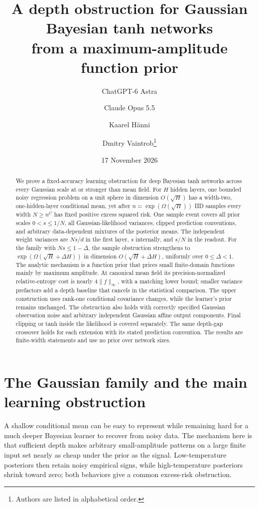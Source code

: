 \documentclass[11pt]{article}
\title{A depth obstruction for Gaussian Bayesian tanh networks\\from a maximum-amplitude function prior}
\author{ChatGPT-6 Astra \and Claude Opus 5.5 \and Kaarel H\"anni \and Dmitry Vaintrob\thanks{Authors are listed in alphabetical order.}}
\date{17 November 2026}
\begin{document}
\maketitle
\begin{abstract}
We prove a fixed-accuracy learning obstruction for deep Bayesian tanh networks across every Gaussian scale at or stronger than mean field. For $H$ hidden layers, one bounded noisy regression problem on a unit sphere in dimension $O(\sqrt H)$ has a width-two, one-hidden-layer conditional mean, yet after $n=\exp(\Omega(\sqrt H))$ IID samples every width $N\ge n^C$ has fixed positive excess squared risk. One sample event covers all prior scales $0<s\le1/N$, all Gaussian-likelihood variances, clipped prediction conventions, and arbitrary data-dependent mixtures of the posterior means. The independent weight variances are $Ns/d$ in the first layer, $s$ internally, and $s/N$ in the readout. For the family with $Ns\le1-\Delta$, the sample obstruction strengthens to $\exp(\Omega(\sqrt H+\Delta H))$ in dimension $O(\sqrt H+\Delta H)$, uniformly over $0\le\Delta<1$. The analytic mechanism is a function prior that prices small finite-domain functions mainly by maximum amplitude. At canonical mean field its precision-normalized relative-entropy cost is nearly $4\|f\|_\infty$, with a matching lower bound; smaller variance prefactors add a depth baseline that cancels in the statistical comparison. The upper construction uses rank-one conditional covariance changes, while the learner's prior remains unchanged. The obstruction also holds with correctly specified Gaussian observation noise and arbitrary independent Gaussian affine output components. Final clipping or tanh inside the likelihood is covered separately. The same depth-gap crossover holds for each extension with its stated prediction convention. The results are finite-width statements and use no prior over network sizes.
\end{abstract}

\section{The Gaussian family and the main learning obstruction}
A shallow conditional mean can be easy to represent while remaining hard for a much deeper Bayesian learner to recover from noisy data. The mechanism here is that sufficient depth makes arbitrary small-amplitude patterns on a large finite input set nearly as cheap under the prior as the signal. Low-temperature posteriors then retain noisy empirical signs, while high-temperature posteriors shrink toward zero; both behaviors give a common excess-risk obstruction.
\end{document}
